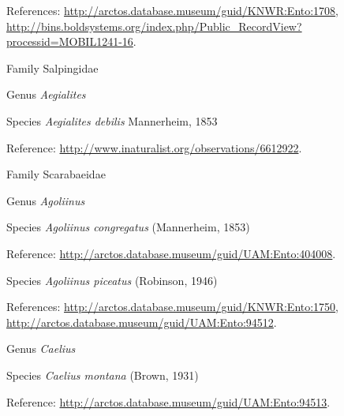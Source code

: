 \documentclass[9pt, article]{memoir}
\begin{document}
\begin{multicols}{2}
\vspace{6pt}References: 
\url{http://arctos.database.museum/guid/KNWR:Ento:1708}, 
\url{http://bins.boldsystems.org/index.php/Public_RecordView?processid=MOBIL1241-16}.

\vspace{6pt}\noindent\hspace{24pt}Family Salpingidae


\vspace{6pt}\noindent\hspace{30pt}Genus \textit{Aegialites}


\vspace{6pt}\noindent\hspace{36pt}Species \textit{Aegialites debilis} Mannerheim, 1853


\vspace{6pt}Reference: 
\url{http://www.inaturalist.org/observations/6612922}.

\vspace{6pt}\noindent\hspace{24pt}Family Scarabaeidae


\vspace{6pt}\noindent\hspace{30pt}Genus \textit{Agoliinus}


\vspace{6pt}\noindent\hspace{36pt}Species \textit{Agoliinus congregatus} (Mannerheim, 1853)


\vspace{6pt}Reference: 
\url{http://arctos.database.museum/guid/UAM:Ento:404008}.

\vspace{6pt}\noindent\hspace{36pt}Species \textit{Agoliinus piceatus} (Robinson, 1946)


\vspace{6pt}References: 
\url{http://arctos.database.museum/guid/KNWR:Ento:1750}, 
\url{http://arctos.database.museum/guid/UAM:Ento:94512}.

\vspace{6pt}\noindent\hspace{30pt}Genus \textit{Caelius}


\vspace{6pt}\noindent\hspace{36pt}Species \textit{Caelius montana} (Brown, 1931)


\vspace{6pt}Reference: 
\url{http://arctos.database.museum/guid/UAM:Ento:94513}.


\end{multicols}
\end{document}

